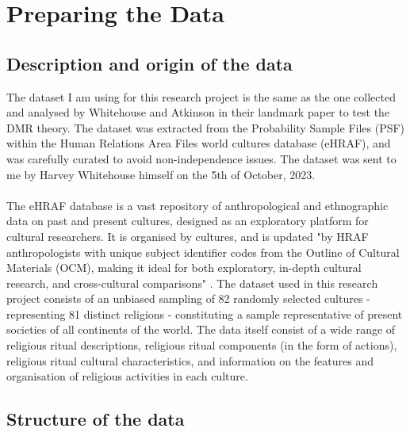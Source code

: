 \documentclass[12pt]{report}
\begin{document}
	\chapter{Preparing the Data}
	\section{Description and origin of the data}
	
	The dataset I am using for this research project is the same as the one collected and analysed by Whitehouse and Atkinson \cite{atkinson2011} in their landmark paper to test the DMR theory. The dataset was extracted from the Probability Sample Files (PSF) within the Human Relations Area Files world cultures database (eHRAF), and was carefully curated to avoid non-independence issues. The dataset was sent to me by Harvey Whitehouse himself on the 5th of October, 2023.\\
	\\
	The eHRAF database is a vast repository of anthropological and ethnographic data on past and present cultures, designed as an exploratory platform for cultural researchers. It is organised by cultures, and is updated "by HRAF anthropologists with unique subject identifier codes from the Outline of Cultural Materials (OCM), making it ideal for both exploratory, in-depth cultural research, and cross-cultural comparisons" \cite{zotero-460}. The dataset used in this research project consists of an unbiased sampling of 82 randomly selected cultures - representing 81 distinct religions - constituting a sample representative of present societies of all continents of the world. The data itself consist of a wide range of religious ritual descriptions, religious ritual components (in the form of actions), religious ritual cultural characteristics, and information on the features and organisation of religious activities in each culture.
	
	\section{Structure of the data}
	
\end{document}
